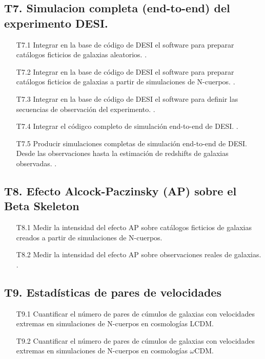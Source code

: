 \subsection*{T7. Simulacion completa (end-to-end) del experimento DESI.}
\begin{itemize}
\item[T7.1] \gradA\prof Integrar en la base de c\'odigo de DESI el software para
  preparar cat\'alogos ficticios de galaxias aleatorios. \bob.
\item[T7.2] \gradA\prof Integrar en la base de c\'odigo de DESI el software para
  preparar cat\'alogos ficticios de galaxias a partir de simulaciones
  de N-cuerpos. \bob.
\item[T7.3] \prof Integrar en la base de c\'odigo de DESI el software para
  definir las secuencias de observaci\'on del experimento. \bob.
\item[T7.4] \prof Integrar el c\'odigco completo de simulaci\'on end-to-end
  de DESI. \bob.
\item[T7.5] \prof Producir simulaciones completas de simulaci\'on end-to-end
  de DESI. Desde las observaciones hasta la estimaci\'on de redshifts
  de galaxias observadas. \bob.
\end{itemize}

\subsection*{T8. Efecto Alcock-Paczinsky (AP) sobre el Beta Skeleton}
\begin{itemize}
\item[T8.1] \gradB Medir la intensidad del efecto AP sobre cat\'alogos
  ficticios de galaxias creados a partir de simulaciones de N-cuerpos.\park
\item[T8.2] \gradB Medir la intensidad del efecto AP sobre observaciones
  reales de galaxias. \park.
\end{itemize}

\subsection*{T9. Estad\'isticas de pares de velocidades}
\begin{itemize}
\item[T9.1] \gradA Cuantificar el n\'umero de pares de c\'umulos de galaxias
  con velocidades extremas en simulaciones de N-cuerpos en
  cosmolog\'ias LCDM. 
\item[T9.2] \gradA Cuantificar el n\'umero de pares de c\'umulos de galaxias
  con velocidades extremas en simulaciones de N-cuerpos en
  cosmolog\'ias $\omega$CDM.
\end{itemize}

